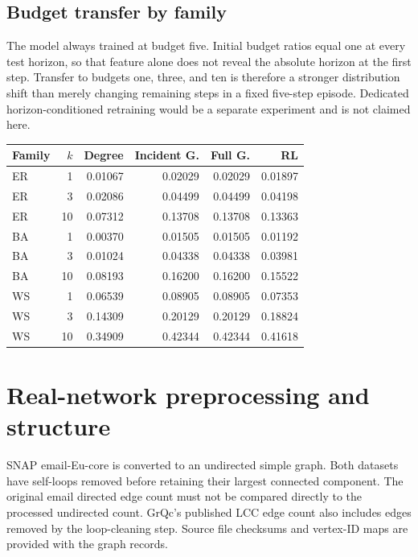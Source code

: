 \documentclass[11pt]{article}
\begin{document}
\subsection{Budget transfer by family}
The model always trained at budget five. Initial budget ratios equal one at
every test horizon, so that feature alone does not reveal the absolute horizon
at the first step. Transfer to budgets one, three, and ten is therefore a
stronger distribution shift than merely changing remaining steps in a fixed
five-step episode. Dedicated horizon-conditioned retraining would be a separate
experiment and is not claimed here.
\begin{longtable}{lrrrrr}
\toprule Family & $k$ & Degree & Incident G. & Full G. & RL\\ \midrule\endhead
ER & 1 & 0.01067 & 0.02029 & 0.02029 & 0.01897\\
ER & 3 & 0.02086 & 0.04499 & 0.04499 & 0.04198\\
ER & 10 & 0.07312 & 0.13708 & 0.13708 & 0.13363\\
BA & 1 & 0.00370 & 0.01505 & 0.01505 & 0.01192\\
BA & 3 & 0.01024 & 0.04338 & 0.04338 & 0.03981\\
BA & 10 & 0.08193 & 0.16200 & 0.16200 & 0.15522\\
WS & 1 & 0.06539 & 0.08905 & 0.08905 & 0.07353\\
WS & 3 & 0.14309 & 0.20129 & 0.20129 & 0.18824\\
WS & 10 & 0.34909 & 0.42344 & 0.42344 & 0.41618\\
\bottomrule\end{longtable}
\section{Real-network preprocessing and structure}
SNAP email-Eu-core is converted to an undirected simple graph. Both datasets
have self-loops removed before retaining their largest connected component.
The original email directed edge count must not be compared directly to the
processed undirected count. GrQc's published LCC edge count also includes
edges removed by the loop-cleaning step. Source file checksums and vertex-ID
maps are provided with the graph records.
\end{document}
